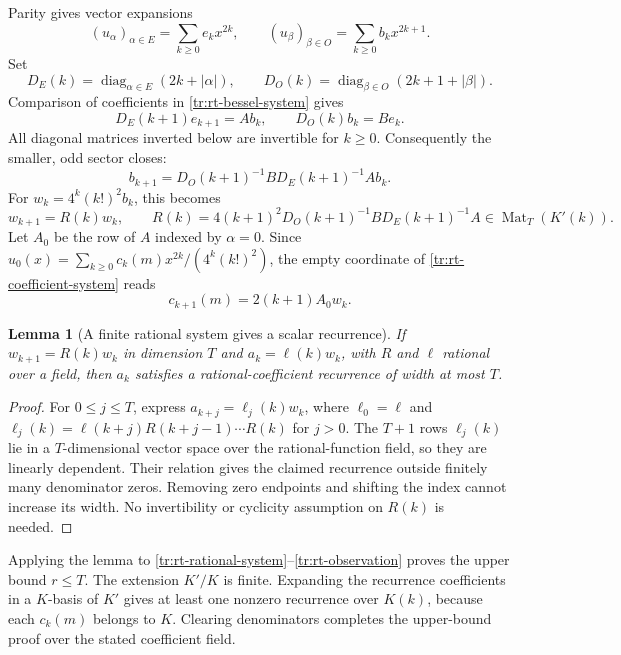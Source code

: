 \documentclass[11pt,a4paper]{article}
\newtheorem{lemma}[theorem]{Lemma}
\theoremstyle{definition}
\theoremstyle{remark}
\numberwithin{equation}{section}
\begin{document}
Parity gives vector expansions
\[
 (u_\alpha)_{\alpha\in E}=\sum_{k\ge0}e_kx^{2k},\qquad
 (u_\beta)_{\beta\in O}=\sum_{k\ge0}b_kx^{2k+1}.
\]
Set
\[
 D_E(k)=\operatorname{diag}_{\alpha\in E}(2k+|\alpha|),
 \qquad D_O(k)=\operatorname{diag}_{\beta\in O}(2k+1+|\beta|).
\]
Comparison of coefficients in \eqref{tr:rt-bessel-system} gives
\begin{equation}
\label{tr:rt-coefficient-system}
 D_E(k+1)e_{k+1}=A b_k,\qquad D_O(k)b_k=B e_k.
\end{equation}
All diagonal matrices inverted below are invertible for $k\ge0$.
Consequently the smaller, odd sector closes:
\[
 b_{k+1}=D_O(k+1)^{-1}B D_E(k+1)^{-1}A b_k.
\]
For $w_k=4^k(k!)^2b_k$, this becomes
\begin{equation}
\label{tr:rt-rational-system}
 w_{k+1}=R(k)w_k,\qquad
 R(k)=4(k+1)^2D_O(k+1)^{-1}B D_E(k+1)^{-1}A
       \in\operatorname{Mat}_T(K'(k)).
\end{equation}
Let $A_0$ be the row of $A$ indexed by $\alpha=0$.
Since
$u_0(x)=\sum_{k\ge0}c_k(m)x^{2k}/(4^k(k!)^2)$,
the empty coordinate of \eqref{tr:rt-coefficient-system} reads
\begin{equation}
\label{tr:rt-observation}
 c_{k+1}(m)=2(k+1)A_0w_k.
\end{equation}

\begin{lemma}[A finite rational system gives a scalar recurrence]
\label{tr:rt-system-lemma}
If $w_{k+1}=R(k)w_k$ in dimension $T$ and
$a_k=\ell(k)w_k$, with $R$ and $\ell$ rational over a field,
then $a_k$ satisfies a rational-coefficient recurrence of width at
most $T$.
\end{lemma}
\begin{proof}
For $0\le j\le T$, express $a_{k+j}=\ell_j(k)w_k$, where
$\ell_0=\ell$ and
$\ell_j(k)=\ell(k+j)R(k+j-1)\cdots R(k)$ for $j>0$.
The $T+1$ rows $\ell_j(k)$ lie in a $T$-dimensional vector space
over the rational-function field, so they are linearly dependent.
Their relation gives the claimed recurrence outside finitely many
denominator zeros.  Removing zero endpoints and shifting the index
cannot increase its width.  No invertibility or cyclicity assumption
on $R(k)$ is needed.
\end{proof}

Applying the lemma to \eqref{tr:rt-rational-system}--\eqref{tr:rt-observation}
proves the upper bound $r\le T$.  The extension $K'/K$ is finite.
Expanding the recurrence coefficients in a $K$-basis of $K'$ gives
at least one nonzero recurrence over $K(k)$, because each $c_k(m)$
belongs to $K$.  Clearing denominators completes the upper-bound
proof over the stated coefficient field.
\end{document}

